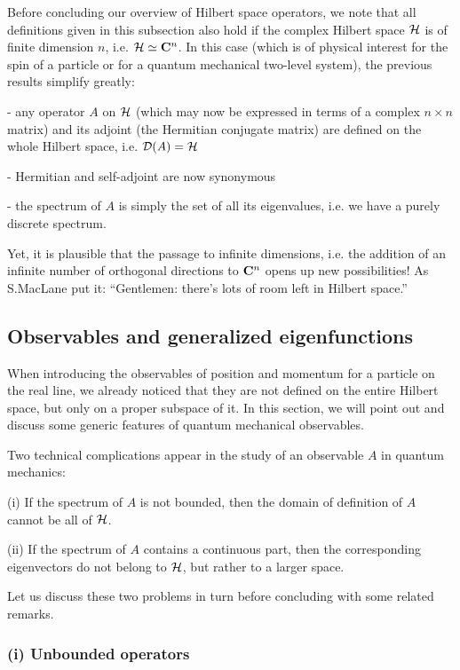\documentclass[12pt]{report}
\begin{document}
Before concluding our overview of Hilbert space operators, 
we note that all definitions
given in this subsection 
also hold if the complex Hilbert space ${\cal H}$
is of finite dimension $n$, i.e. ${\cal H} \simeq {\bf C}^n$.
In this case (which is of physical interest for  
the spin of a particle or for a quantum mechanical two-level system),  
the previous results simplify greatly: 

- any operator $A$ on ${\cal H}$  
(which may now be expressed in terms of a complex $n\times n$ matrix)
and its adjoint (the Hermitian conjugate matrix) 
are  defined on the whole Hilbert space, 
i.e. ${\cal D}(A) = {\cal H}$

- Hermitian and self-adjoint are now synonymous

- the spectrum 
of $A$ is simply the set of all its eigenvalues, i.e. we have  
 a purely discrete spectrum.    

Yet, it is plausible that the passage to infinite dimensions, i.e. 
the addition of 
an infinite number of orthogonal directions 
to ${\bf C}^n$ 
opens up new possibilities!
As S.MacLane put it: ``Gentlemen: there's lots of room 
left in Hilbert space.'' \cite{rs}

\subsection{Observables and generalized eigenfunctions}

When introducing the observables of position and momentum
for a particle on the real line, we already noticed that they 
are not defined on the entire Hilbert space, but 
only on a proper subspace of it. 
In this section, we will point out and discuss 
some generic features
of quantum mechanical observables. 


Two technical complications appear in the study 
of an observable $A$
in quantum mechanics:
 
\noindent (i) If the spectrum of $A$ is not bounded, then 
the domain of definition of $A$ cannot be all of ${\cal H}$.
 
\noindent (ii) If the spectrum of $A$ contains a continuous part,  
then the corresponding eigenvectors 
do not belong to ${\cal H}$, but rather to a larger space.  
 
Let us discuss 
these two problems in turn before concluding with some related remarks.  

\subsubsection{(i) Unbounded operators}
\end{document}
